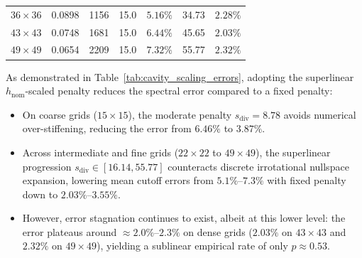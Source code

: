 \documentclass[VANCOUVER,Times1COL]{WileyNJD-v5}
\begin{document}
\begin{table}[!t]
{\begin{tabular}{ccccccc}
            $36 \times 36$            & 0.0898                                       & 1156            & 15.0                                                                   & $5.16\%$                                                                                      & 34.73                              & $\mathbf{2.28\%}$                                    \\
            $43 \times 43$            & 0.0748                                       & 1681            & 15.0                                                                   & $6.44\%$                                                                                      & 45.65                              & $\mathbf{2.03\%}$                                    \\
            $49 \times 49$            & 0.0654                                       & 2209            & 15.0                                                                   & $7.32\%$                                                                                      & 55.77                              & $\mathbf{2.32\%}$                                    \\
            \bottomrule
        \end{tabular}
    }
\end{table}

As demonstrated in Table~\ref{tab:cavity_scaling_errors}, adopting the superlinear $h_{\mathrm{nom}}$-scaled penalty reduces the spectral error compared to a fixed penalty:
\begin{itemize}
    \item On coarse grids ($15 \times 15$), the moderate penalty $s_{\mathrm{div}} = 8.78$ avoids numerical over-stiffening, reducing the error from $6.46\%$ to $3.87\%$.
    \item Across intermediate and fine grids ($22 \times 22$ to $49 \times 49$), the superlinear progression $s_{\mathrm{div}} \in [16.14, 55.77]$ counteracts discrete irrotational nullspace expansion, lowering mean cutoff errors from $5.1\%\text{--}7.3\%$ with fixed penalty down to $2.03\%\text{--}3.55\%$.
    \item However, error stagnation continues to exist, albeit at this lower level: the error plateaus around $\approx 2.0\%\text{--}2.3\%$ on dense grids ($2.03\%$ on $43 \times 43$ and $2.32\%$ on $49 \times 49$), yielding a sublinear empirical rate of only $p \approx 0.53$.
\end{itemize}
\end{document}
